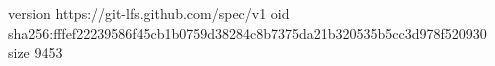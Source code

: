 version https://git-lfs.github.com/spec/v1
oid sha256:fffef22239586f45cb1b0759d38284c8b7375da21b320535b5cc3d978f520930
size 9453
